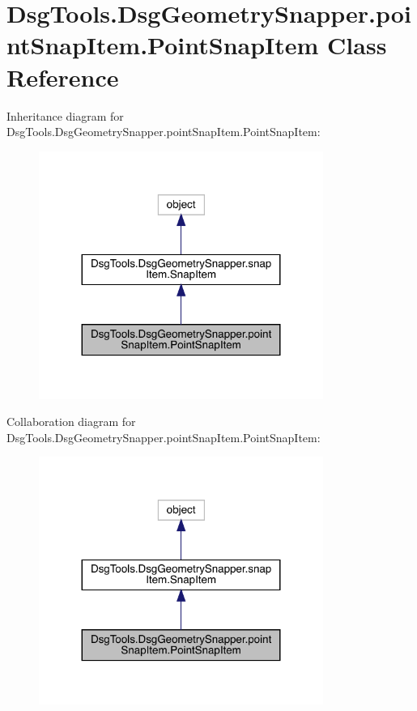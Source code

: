 \hypertarget{class_dsg_tools_1_1_dsg_geometry_snapper_1_1point_snap_item_1_1_point_snap_item}{}\section{Dsg\+Tools.\+Dsg\+Geometry\+Snapper.\+point\+Snap\+Item.\+Point\+Snap\+Item Class Reference}
\label{class_dsg_tools_1_1_dsg_geometry_snapper_1_1point_snap_item_1_1_point_snap_item}


Inheritance diagram for Dsg\+Tools.\+Dsg\+Geometry\+Snapper.\+point\+Snap\+Item.\+Point\+Snap\+Item\+:
\nopagebreak
\begin{figure}[H]
\begin{center}
\leavevmode
\includegraphics[width=263pt]{class_dsg_tools_1_1_dsg_geometry_snapper_1_1point_snap_item_1_1_point_snap_item__inherit__graph}
\end{center}
\end{figure}


Collaboration diagram for Dsg\+Tools.\+Dsg\+Geometry\+Snapper.\+point\+Snap\+Item.\+Point\+Snap\+Item\+:
\nopagebreak
\begin{figure}[H]
\begin{center}
\leavevmode
\includegraphics[width=263pt]{class_dsg_tools_1_1_dsg_geometry_snapper_1_1point_snap_item_1_1_point_snap_item__coll__graph}
\end{center}
\end{figure}
